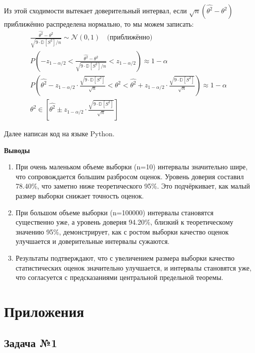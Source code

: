 \documentclass[12pt]{article}
\begin{document}
	Из этой сходимости вытекает доверительный интервал, если $ \sqrt{n}(\widehat{\theta^2} - \theta^2) $ приближённо распределена нормально, то мы можем записать:
	\begin{gather*}
		\frac{\widehat{\theta^2} - \theta^2}{\sqrt{9 \cdot \mathbb{D}[S^2] / n}} \sim \mathcal{N}(0, 1) \quad \text{(приближённо)} \\
		P\left( -z_{1 - \alpha/2} < \frac{\widehat{\theta^2} - \theta^2}{\sqrt{9 \cdot \mathbb{D}[S^2] / n}} < z_{1 - \alpha/2} \right) \approx 1 - \alpha \\
		P\left( \widehat{\theta^2} - z_{1 - \alpha/2} \cdot \frac{\sqrt{9 \cdot \mathbb{D}[S^2]}}{\sqrt{n}} < \theta^2 < \widehat{\theta^2} + z_{1 - \alpha/2} \cdot \frac{\sqrt{9 \cdot \mathbb{D}[S^2]}}{\sqrt{n}} \right) \approx 1 - \alpha \\
		\theta^2 \in \left[ \widehat{\theta^2} \pm z_{1 - \alpha/2} \cdot \frac{\sqrt{9 \cdot \mathbb{D}[S^2]}}{\sqrt{n}} \right]
	\end{gather*}
	
	Далее написан код на языке Python.
	\newpage
	
	\textbf{Выводы}
	\begin{enumerate}
		\centering
		\item При очень маленьком объеме выборки (n=10) интервалы значительно шире, что сопровождается большим разбросом оценок. Уровень доверия составил 78.40\%, что заметно ниже теоретического 95\%. Это подчёркивает, как малый размер выборки снижает точность оценок.
		\item При большом объеме выборки (n=100000) интервалы становятся существенно уже, а уровень доверия 94.20\%, близкий к теоретическому значению 95\%, демонстрирует, как с ростом выборки качество оценок улучшается и доверительные интервалы сужаются.
		\item Результаты подтверждают, что с увеличением размера выборки качество статистических оценок значительно улучшается, и интервалы становятся уже, что согласуется с предсказаниями центральной предельной теоремы.
	\end{enumerate}
	\newpage
	
	\section*{Приложения}
	
	\subsection*{Задача №1}
	
\end{document}
